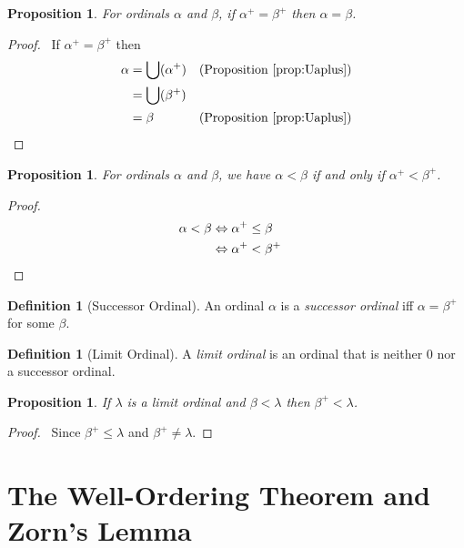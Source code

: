 \documentclass{book}
\let\qed\relax
\newtheorem{prop}[ax]{Proposition}
\theoremstyle{definition}
\newtheorem{df}[ax]{Definition}
\begin{document}
\begin{prop}
\label{prop:Peano2}
For ordinals $\alpha$ and $\beta$, if $\alpha^+ = \beta^+$ then $\alpha = \beta$.
\end{prop}

\begin{proof}
	\pf\ If $\alpha^+ = \beta^+$ then
	\begin{align*}
		\alpha & = \bigcup (\alpha^+) & (\text{Proposition \ref{prop:Uaplus}}) \\
		& = \bigcup (\beta^+) \\
		& = \beta & (\text{Proposition \ref{prop:Uaplus}})
	\end{align*}
\end{proof}

\begin{prop}
\label{prop:succltsucc}
For ordinals $\alpha$ and $\beta$, we have $\alpha < \beta$ if and only if $\alpha^+ < \beta^+$.
\end{prop}

\begin{proof}
\pf
\begin{align*}
\alpha < \beta & \Leftrightarrow \alpha^+ \leq \beta \\
& \Leftrightarrow \alpha^+ < \beta^+ & \qed
\end{align*}
\end{proof}

\begin{df}[Successor Ordinal]
An ordinal $\alpha$ is a \emph{successor ordinal} iff $\alpha = \beta^+$ for some $\beta$.
\end{df}

\begin{df}[Limit Ordinal]
A \emph{limit ordinal} is an ordinal that is neither 0 nor a successor ordinal.
\end{df}

\begin{prop}
If $\lambda$ is a limit ordinal and $\beta < \lambda$ then $\beta^+ < \lambda$.
\end{prop}

\begin{proof}
\pf\ Since $\beta^+ \leq \lambda$ and $\beta^+ \neq \lambda$. \qed
\end{proof}

\section{The Well-Ordering Theorem and Zorn's Lemma}
\end{document}
